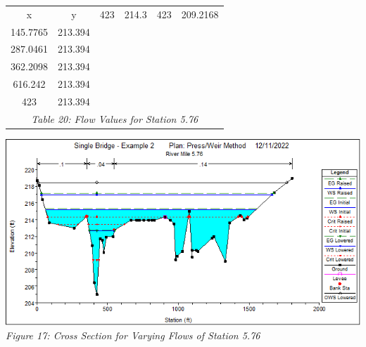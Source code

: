\begin{center}
\begin{tabular}{|cc|cc|cc|}
    \cline{1-2}
    x        & y                                             & 423      & 214.3                                     & 423      & 209.2168                                        \\
    145.7765 & 213.394                                       &          &                                           &          &                                                 \\
    287.0461 & 213.394                                       &          &                                           &          &                                                 \\
    362.2098 & 213.394                                       &          &                                           &          &                                                 \\
    616.242  & 213.394                                       &          &                                           &          &                                                 \\
    423      & 213.394                                       &          &                                           &          &                                                 \\
    \hline\multicolumn{6}{c}{\emph{Table 20: Flow Values for Station 5.76}}
    \end{tabular}
    \vspace{5mm}
    \begin{center}
        \includegraphics[scale=0.7, frame]{fig17.png}
        \\\emph{Figure 17: Cross Section for Varying Flows of Station 5.76}\\
    \end{center}

\newpage
\end{center}
